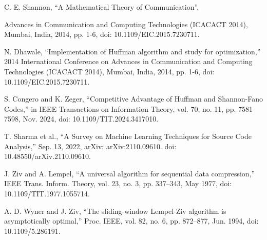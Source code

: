 \documentclass[12pt,twoside]{article}
\begin{document}
\begin{thebibliography}{9}
     C. E. Shannon, ``A Mathematical Theory of Communication''.

     Advances in Communication and Computing Technologies (ICACACT 2014), Mumbai, India, 2014, pp. 1-6, doi: 10.1109/EIC.2015.7230711.

     N. Dhawale, ``Implementation of Huffman algorithm and study for optimization,'' 2014 International Conference on Advances in Communication and Computing Technologies (ICACACT 2014), Mumbai, India, 2014, pp. 1-6, doi: 10.1109/EIC.2015.7230711.

     S. Congero and K. Zeger, ``Competitive Advantage of Huffman and Shannon-Fano Codes,'' in IEEE Transactions on Information Theory, vol. 70, no. 11, pp. 7581-7598, Nov. 2024, doi: 10.1109/TIT.2024.3417010.

     T. Sharma et al., ``A Survey on Machine Learning Techniques for Source Code Analysis,'' Sep. 13, 2022, arXiv: arXiv:2110.09610. doi: 10.48550/arXiv.2110.09610.

     J. Ziv and A. Lempel, “A universal algorithm for sequential data compression,” IEEE Trans. Inform. Theory, vol. 23, no. 3, pp. 337–343, May 1977, doi: 10.1109/TIT.1977.1055714.

     A. D. Wyner and J. Ziv, “The sliding-window Lempel-Ziv algorithm is asymptotically optimal,” Proc. IEEE, vol. 82, no. 6, pp. 872–877, Jun. 1994, doi: 10.1109/5.286191.




\end{thebibliography}

\newpage
\appendix
\end{document}
